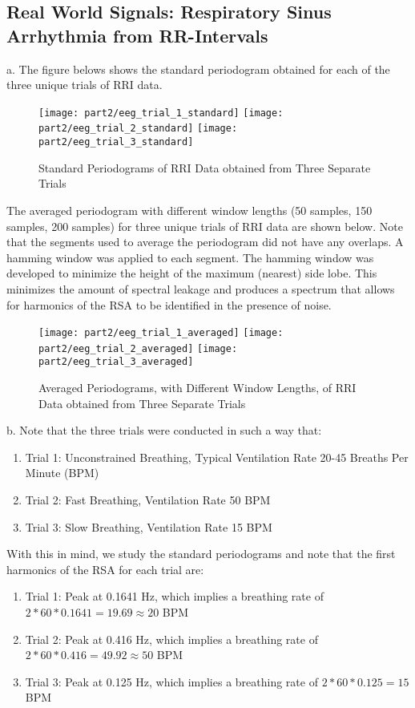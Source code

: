 \subsection{Real World Signals: Respiratory Sinus Arrhythmia from RR-Intervals}

\noindent{}a. The figure belows shows the standard periodogram obtained for each of the three unique trials of RRI data.

\begin{figure}[H]
\centering{}
\texttt{[image: part2/eeg\_trial\_1\_standard]}
\texttt{[image: part2/eeg\_trial\_2\_standard]}
\texttt{[image: part2/eeg\_trial\_3\_standard]}
\caption{Standard Periodograms of RRI Data obtained from Three Separate Trials}
\end{figure}

\noindent{}The averaged periodogram with different window lengths (50 samples, 150 samples, 200 samples) for three unique trials of RRI data are shown below. Note that the segments used to average the periodogram did not have any overlaps. A hamming window was applied to each segment. The hamming window was developed to minimize the height of the maximum (nearest) side lobe. This minimizes the amount of spectral leakage and produces a spectrum that allows for harmonics of the RSA to be identified in the presence of noise.

\begin{figure}[H]
\centering{}
\texttt{[image: part2/eeg\_trial\_1\_averaged]}
\texttt{[image: part2/eeg\_trial\_2\_averaged]}
\texttt{[image: part2/eeg\_trial\_3\_averaged]}
\caption{Averaged Periodograms, with Different Window Lengths, of RRI Data obtained from Three Separate Trials}
\end{figure}

\noindent{}b. Note that the three trials were conducted in such a way that:
\begin{enumerate}
\item Trial 1: Unconstrained Breathing, Typical Ventilation Rate 20-45 Breaths Per Minute (BPM)
\item Trial 2: Fast Breathing, Ventilation Rate 50 BPM
\item Trial 3: Slow Breathing, Ventilation Rate 15 BPM
\end{enumerate}

\noindent{}With this in mind, we study the standard periodograms and note that the first harmonics of the RSA for each trial are:
\begin{enumerate}
\item Trial 1: Peak at 0.1641 Hz, which implies a breathing rate of $2*60*0.1641 = 19.69 \approx 20$ BPM
\item Trial 2: Peak at 0.416 Hz, which implies a breathing rate of $2*60*0.416 = 49.92 \approx 50$ BPM
\item Trial 3: Peak at 0.125 Hz, which implies a breathing rate of $2*60*0.125 = 15$ BPM
\end{enumerate}


